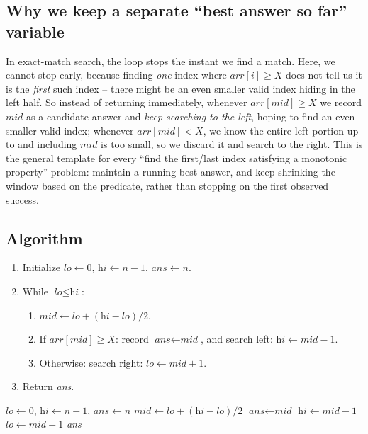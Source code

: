 \subsection*{Why we keep a separate ``best answer so far'' variable}

In exact-match search, the loop stops the instant we find a match. Here, we
cannot stop early, because finding \emph{one} index where $\textit{arr}[i]
\ge X$ does not tell us it is the \emph{first} such index -- there might be
an even smaller valid index hiding in the left half. So instead of
returning immediately, whenever $\textit{arr}[\textit{mid}] \ge X$ we
record $\textit{mid}$ as a candidate answer and \emph{keep searching to the
left}, hoping to find an even smaller valid index; whenever
$\textit{arr}[\textit{mid}] < X$, we know the entire left portion up to and
including $\textit{mid}$ is too small, so we discard it and search to the
right. This is the general template for every ``find the first/last index
satisfying a monotonic property'' problem: maintain a running best answer,
and keep shrinking the window based on the predicate, rather than stopping
on the first observed success.

\subsection*{Algorithm}

\begin{enumerate}
  \item Initialize $\textit{lo} \gets 0$, $\textit{hi} \gets n-1$,
        $\textit{ans} \gets n$.
  \item While $\textit{lo} \le \textit{hi}$:
  \begin{enumerate}
    \item $\textit{mid} \gets \textit{lo} + (\textit{hi}-\textit{lo})/2$.
    \item If $\textit{arr}[\textit{mid}] \ge X$: record
          $\textit{ans} \gets \textit{mid}$, and search left:
          $\textit{hi} \gets \textit{mid}-1$.
    \item Otherwise: search right: $\textit{lo} \gets \textit{mid}+1$.
  \end{enumerate}
  \item Return \textit{ans}.
\end{enumerate}

\begin{algorithm}[H]
\caption{Lower Bound}
\begin{algorithmic}[1]
  \State $\textit{lo} \gets 0$, $\textit{hi} \gets n-1$, $\textit{ans} \gets n$
    \State $\textit{mid} \gets \textit{lo} + (\textit{hi}-\textit{lo})/2$
      \State $\textit{ans} \gets \textit{mid}$
      \State $\textit{hi} \gets \textit{mid} - 1$
    \Else
      \State $\textit{lo} \gets \textit{mid} + 1$
    \EndIf
  \EndWhile
  \State \Return \textit{ans}
\EndProcedure
\end{algorithmic}
\end{algorithm}

